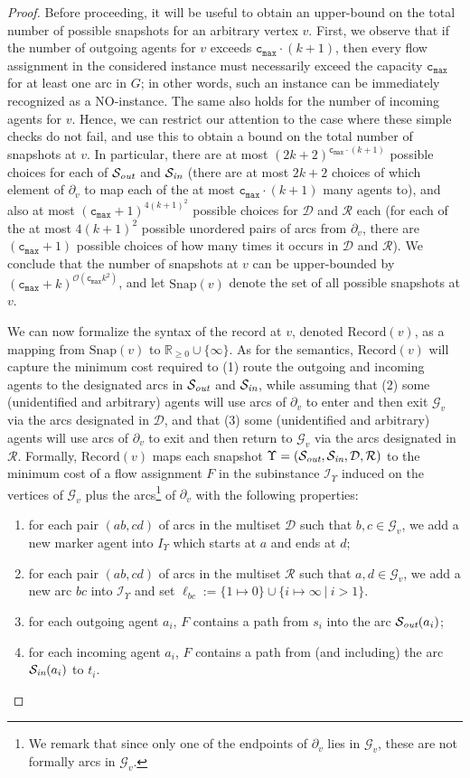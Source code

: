 \documentclass[letterpaper]{article} %
\newcommand{\bigoh}{\ensuremath{{\mathcal O}}}
\newcommand{\cmax}{\mathtt{c_{max}}}
\newcommand{\forgottenG}{\mathcal{G}}
\newcommand{\Rec}{\text{Record}}
\renewcommand{\R}{\mathcal{R}}
\renewcommand{\D}{\mathcal{D}}
\newcommand{\Sout}{\mathcal{S}_\emph{out}}
\newcommand{\Sin}{\mathcal{S}_\emph{in}}
\newcommand{\snap}{\text{Snap}}
\begin{document}
\begin{proof}
Before proceeding, it will be useful to obtain an upper-bound on the total number of possible snapshots for an arbitrary vertex $v$. First, we observe that if the number of outgoing agents for $v$ exceeds $\cmax \cdot(k+1)$, then every flow assignment in the considered instance must necessarily exceed the capacity $\cmax$ for at least one arc in $G$; in other words, such an instance can be immediately recognized as a NO-instance. The same also holds for the number of incoming agents for $v$. Hence, we can restrict our attention to the case where these simple checks do not fail, and use this to obtain a bound on the total number of snapshots at $v$. In particular, there are at most $(2k+2)^{\cmax \cdot(k+1)}$ possible choices for each of $\Sout$ and $\Sin$ (there are at most $2k+2$ choices of which element of $\partial_v$ to map each of the at most $\cmax \cdot(k+1)$ many agents to), and also at most $(\cmax+1)^{4(k+1)^2}$ possible choices for $\D$ and $\R$ each (for each of the at most $4(k+1)^2$ possible unordered pairs of arcs from $\partial_v$, there are $(\cmax+1)$ possible choices of how many times it occurs in $\D$ and $\R$). We conclude that the number of snapshots at $v$ can be upper-bounded by $(\cmax+k)^{\bigoh(\cmax k^2)}$, and let $\snap(v)$ denote the set of all possible snapshots at $v$.

We can now formalize the syntax of the record at $v$, denoted $\Rec(v)$, as a mapping from $\snap(v)$ to $\mathbb{R}_{\geq 0}\cup \{\infty\}$. As for the semantics, $\Rec(v)$ will capture the minimum cost required to (1) route the outgoing and incoming agents to the designated arcs in $\Sout$ and $\Sin$, while assuming that (2) some (unidentified and arbitrary) agents will use arcs of $\partial_v$ to enter and then exit $\forgottenG_v$ via the arcs designated in $\D$, and that (3) some (unidentified and arbitrary) agents will use arcs of $\partial_v$ to exit and then return to $\forgottenG_v$ via the arcs designated in~$\R$.
Formally, $\Rec(v)$ maps each snapshot $\Upsilon=(\Sout,\Sin,\D,\R)$ to the minimum cost of a flow assignment $F$ in the subinstance $\mathcal{I}_\Upsilon$ induced on the vertices of $\forgottenG_v$ plus the arcs\footnote{We remark that since only one of the endpoints of $\partial_v$ lies in $\forgottenG_v$, these are not formally arcs in $\forgottenG_v$.} of $\partial_v$ with the following properties:
\begin{enumerate}
\item for each pair $(ab,cd)$ of arcs in the multiset $\D$ such that $b,c\in \forgottenG_v$, we add a new marker agent into $I_\Upsilon$ which starts at $a$ and ends at $d$;
\item for each pair $(ab,cd)$ of arcs in the multiset $\R$ such that $a,d\in \forgottenG_v$, we add a new arc $bc$ into $\mathcal{I}_\Upsilon$ and set $\ell_{bc}:=\{1\mapsto 0\}\cup \{i\mapsto \infty~|~i>1\}$.
\item for each outgoing agent $a_i$, $F$ contains a path from $s_i$ into the arc $\Sout(a_i)$;
\item for each incoming agent $a_i$, $F$ contains a path from (and including) the arc $\Sin(a_i)$ to $t_i$.
\end{enumerate}


\end{proof}
\end{document}
